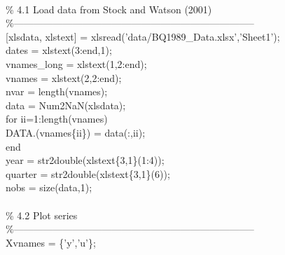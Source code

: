 \hspace{1mm} \\ 
\hspace{1mm}\textcolor{matlabgreen}{\% 4.1 Load data from Stock and Watson (2001) }\\ 
\hspace{1mm}\textcolor{matlabgreen}{\%--------------------------------------------------------------------------  }\\ 
\hspace{1mm}[xlsdata, xlstext] = xlsread(\textcolor{matlabpurple}{'data/BQ1989\_Data.xlsx'},\textcolor{matlabpurple}{'Sheet1'}); \\ 
\hspace{1mm}dates = xlstext(3:end,1); \\ 
\hspace{1mm}vnames\_long = xlstext(1,2:end); \\ 
\hspace{1mm}vnames = xlstext(2,2:end); \\ 
\hspace{1mm}nvar = length(vnames); \\ 
\hspace{1mm}data   = Num2NaN(xlsdata); \\ 
\hspace{1mm}\textcolor{matlabblue}{for} ii=1:length(vnames) \\ 
\hspace{1mm}\hspace{5mm} DATA.(vnames\{ii\}) = data(:,ii); \\ 
\hspace{1mm}\textcolor{matlabblue}{end} \\ 
\hspace{1mm}year = str2double(xlstext\{3,1\}(1:4)); \\ 
\hspace{1mm}quarter = str2double(xlstext\{3,1\}(6)); \\ 
\hspace{1mm}nobs = size(data,1); \\ 
\hspace{1mm} \\ 
\hspace{1mm}\textcolor{matlabgreen}{\% 4.2 Plot series }\\ 
\hspace{1mm}\textcolor{matlabgreen}{\%--------------------------------------------------------------------------  }\\ 
\hspace{1mm}Xvnames      = \{\textcolor{matlabpurple}{'y'},\textcolor{matlabpurple}{'u'}\}; \\ 
